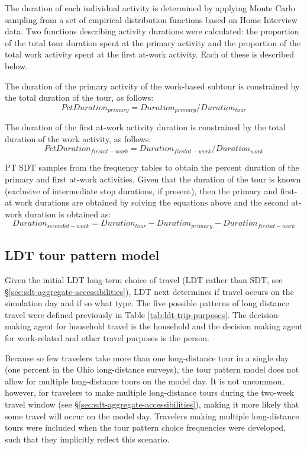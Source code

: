 \noindent The duration of each individual activity is determined by applying Monte Carlo sampling from a set of empirical distribution functions based on Home Interview data. Two functions describing activity durations were calculated: the proportion of the total tour duration spent at the primary activity and the proportion of the total work activity spent at the first at-work activity. Each of these is described below.

The duration of the primary activity of the work-based subtour is constrained by the total duration of the tour, as follows:
\begin{equation}
PctDuration_{primary} = Duration_{primary} / Duration_{tour}
\end{equation}

\noindent The duration of the first at-work activity duration is constrained by the total duration of the work activity, as follows:
\begin{equation}
PctDuration_{first at-work} = Duration_{first at-work} / Duration_{work}
\end{equation}

\noindent PT SDT samples from the frequency tables to obtain the percent duration of the primary and first at-work activities. Given that the duration of the tour is known (exclusive of intermediate stop durations, if present), then the primary and first-at work durations are obtained by solving the equations above and the second at-work duration is obtained as:
\begin{equation}
Duration_{second at-work} = Duration_{tour} - Duration_{primary} - Duration_{first at-work}
\end{equation}

\subsection{LDT tour pattern model}\label{sec:ldt-tour-pattern}
Given the initial LDT long-term choice of travel (LDT rather than SDT, see \S\ref{sec:sdt-aggregate-accessibilities}), LDT next determines if travel occurs on the simulation day and if so what type. The five possible patterns of long distance travel were defined previously in Table \ref{tab:ldt-trip-purposes}. The decision-making agent for household travel is the household and the decision making agent for work-related and other travel purposes is the person.

Because so few travelers take more than one long-distance tour in a single day (one percent in the Ohio long-distance surveys), the tour pattern model does not allow for multiple long-distance tours on the model day. It is not uncommon, however, for travelers to make multiple long-distance tours during the two-week travel window (see \S\ref{sec:sdt-aggregate-accessibilities}), making it more likely that some travel will occur on the model day. Travelers making multiple long-distance tours were included when the tour pattern choice frequencies were developed, such that they implicitly reflect this scenario.

